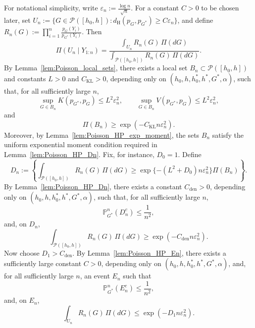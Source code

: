 \documentclass[twoside,12pt]{article}
\renewcommand{\P}{\mathds{P}}
\begin{document}
For notational simplicity, write $\varepsilon_n:=\frac{\log n}{\sqrt n}$. For a constant $C>0$ to be chosen later, set $U_n:=\{G\in\mathcal P([h_0,h]):d_{\mathrm H}(p_G,p_{G^\ast})\ge C\varepsilon_n\}$, and define $R_n(G):=\prod_{i=1}^n\frac{p_G(Y_i)}{p_{G^\ast}(Y_i)}$. Then
\begin{displaymath}
\Pi(U_n\mid Y_{1:n})=\frac{\int_{U_n}R_n(G)\,\Pi(dG)}{\int_{\mathcal P([h_0,h])}R_n(G)\,\Pi(dG)}.
\end{displaymath}
By Lemma~\ref{lem:Poisson_local_sets}, there exists a local set $B_n\subset\mathcal P([h_0,h])$ and constants $L>0$ and $C_{\mathrm{KL}}>0$, depending only on $(h_0,h,h_0^\ast,h^\ast,G^\ast,\alpha)$, such that, for all sufficiently large $n$,
\begin{displaymath}
\sup_{G\in B_n}K(p_{G^\ast},p_G)\le L^2\varepsilon_n^2,\qquad\sup_{G\in B_n}V(p_{G^\ast},p_G)\le L^2\varepsilon_n^2,
\end{displaymath}
and
\begin{displaymath}
\Pi(B_n)\ge \exp(-C_{\mathrm{KL}}n\varepsilon_n^2).
\end{displaymath}
Moreover, by Lemma~\ref{lem:Poisson_HP_exp_moment}, the sets $B_n$ satisfy the uniform exponential moment condition required in Lemma~\ref{lem:Poisson_HP_Dn}. Fix, for instance, $D_0=1$. Define
\begin{displaymath}
D_n:=\left\{\int_{\mathcal P([h_0,h])}R_n(G)\,\Pi(dG)\ge\exp\{-(L^2+D_0)n\varepsilon_n^2\}\Pi(B_n)\right\}.
\end{displaymath}
By Lemma~\ref{lem:Poisson_HP_Dn}, there exists a constant $C_{\mathrm{den}}>0$, depending only on $(h_0,h,h_0^\ast,h^\ast,G^\ast,\alpha)$, such that, for all sufficiently
large $n$,
\begin{displaymath}
\P_{G^\ast}^n(D_n^c)\le \frac{1}{n^2},
\end{displaymath}
and, on $D_n$,
\begin{displaymath}
\int_{\mathcal P([h_0,h])}R_n(G)\,\Pi(dG)\ge\exp(-C_{\mathrm{den}}n\varepsilon_n^2).
\end{displaymath}
Now choose $D_1>C_{\mathrm{den}}$. By Lemma~\ref{lem:Poisson_HP_En}, there exists a sufficiently large constant $C>0$, depending only on $(h_0,h,h_0^\ast,h^\ast,G^\ast,\alpha)$, and, for all sufficiently large $n$, an event $E_n$ such that
\begin{displaymath}
\P_{G^\ast}^n(E_n^c)\le \frac{1}{n^2},
\end{displaymath}
and, on $E_n$,
\begin{displaymath}
\int_{U_n}R_n(G)\,\Pi(dG)\le\exp(-D_1n\varepsilon_n^2).
\end{displaymath}
\end{document}
